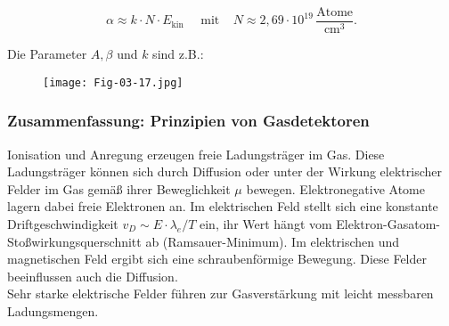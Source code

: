 \[\alpha \approx k\cdot N \cdot E_\text{kin} ~~~~~~ \text{mit}~~~~~N\approx 2{,}69\cdot
10^{19}\,\frac{\text{Atome}}{\text{cm}^3}.\]

Die Parameter $A, \beta$ und $k$ sind z.B.:

\begin{figure}[H]
	\centering
	\texttt{[image: Fig-03-17.jpg]}
\end{figure}

\subsubsection*{Zusammenfassung: Prinzipien von Gasdetektoren}

Ionisation und Anregung erzeugen freie Ladungsträger im Gas. Diese Ladungsträger können sich durch
Diffusion oder unter der Wirkung elektrischer Felder im Gas gemäß ihrer Beweglichkeit $\mu$
bewegen. Elektronegative Atome lagern dabei freie Elektronen an. Im elektrischen Feld stellt sich
eine konstante Driftgeschwindigkeit $v_D\sim E\cdot\lambda_e/T$ ein, ihr Wert hängt vom
Elektron-Gasatom-Stoßwirkungsquerschnitt ab (Ramsauer-Minimum). Im elektrischen und magnetischen
Feld ergibt sich eine schraubenförmige Bewegung. Diese Felder beeinflussen auch die Diffusion.
\\
Sehr starke elektrische Felder führen zur Gasverstärkung mit leicht messbaren Ladungsmengen.
